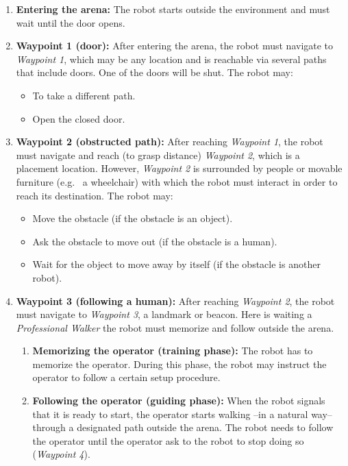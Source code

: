 \begin{enumerate}
	\item \textbf{Entering the arena:} The robot starts outside the environment and must wait until the door opens.

	\item \textbf{Waypoint 1 (door):} After entering the arena, the robot must navigate to \textit{Waypoint 1}, which may be any location and is reachable via several paths that include doors. One of the doors will be shut. The robot may:
	\begin{itemize}
		\item To take a different path.
		\item Open the closed door.
	\end{itemize}

	\item \textbf{Waypoint 2 (obstructed path):} After reaching \textit{Waypoint 1}, the robot must navigate and reach (to grasp distance) \textit{Waypoint 2}, which is a placement location. However, \textit{Waypoint 2} is surrounded by people or movable furniture (e.g.~ a wheelchair) with which the robot must interact in order to reach its destination. The robot may:
	\begin{itemize}
		\item Move the obstacle (if the obstacle is an object).
		\item Ask the obstacle to move out (if the obstacle is a human).
		\item Wait for the object to move away by itself (if the obstacle is another robot).
	\end{itemize}

	\item \textbf{Waypoint 3 (following a human):} After reaching \textit{Waypoint 2}, the robot must navigate to \textit{Waypoint 3}, a landmark or beacon. Here is waiting a \textit{Professional Walker} the robot must memorize and follow outside the arena.

	\begin{enumerate}
	\item \textbf{Memorizing the operator (training phase):} The robot has to memorize the operator. During this phase, the robot may instruct the operator to follow a certain setup procedure.
	\item \textbf{Following the operator (guiding phase):} When the robot signals that it is ready to start, the operator starts walking --in a natural way-- through a designated path outside the arena. The robot needs to follow the operator until the operator ask to the robot to stop doing so (\textit{Waypoint 4}).
	\end{enumerate}


\end{enumerate}
